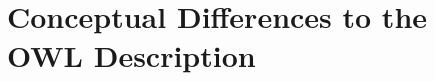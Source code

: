 \section{Conceptual Differences to the OWL Description}
\label{CoreASM-Reference-Implementation-Differences-OWL-Model}


\newcommand\OWLClass[1]{{\textcolor{OWLClass}{\textbf{#1}}}}
\newcommand\OWLObjectProperty[1]{{\textcolor{OWLObjectProperty}{\textbf{#1}}}}
\newcommand\OWLDataProperty[1]{{\textcolor{OWLDataProperty}{\textbf{#1}}}}
\newcommand\OWLIndividual[1]{{\textcolor{OWLIndividual}{\textbf{#1}}}}







